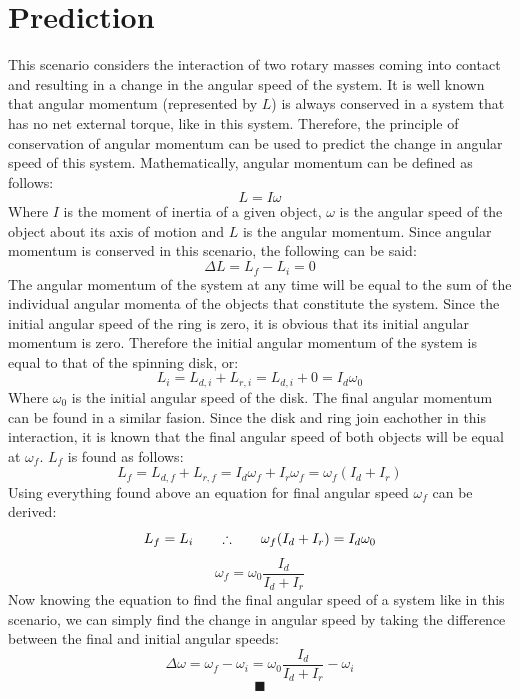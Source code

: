 \documentclass[12pt,letterpaper]{article}
\begin{document}
\section{Prediction}
This scenario considers the interaction of two rotary masses coming into contact and resulting in a change in the angular speed of the system. It is well known that angular momentum (represented by \(L\)) is always conserved in a system that has no net external torque, like in this system. Therefore, the principle of conservation of angular momentum can be used to predict the change in angular speed of this system. Mathematically, angular momentum can be defined as follows:
\begin{equation}
L = I\omega
\end{equation}
Where \(I\) is the moment of inertia of a given object, \(\omega\) is the angular speed of the object about its axis of motion and \(L\) is the angular momentum. Since angular momentum is conserved in this scenario, the following can be said:
\begin{equation}
\Delta L = L_f - L_i = 0
\end{equation}
The angular momentum of the system at any time will be equal to the sum of the individual angular momenta of the objects that constitute the system. Since the initial angular speed of the ring is zero, it is obvious that its initial angular momentum is zero. Therefore the initial angular momentum of the system is equal to that of the spinning disk, or:
\begin{equation}
L_i = L_{d,i} + L_{r,i} = L_{d,i} + 0 = I_d\omega_0
\end{equation}
Where \(\omega_0\) is the initial angular speed of the disk. The final angular momentum can be found in a similar fasion. Since the disk and ring join eachother in this interaction, it is known that the final angular speed of both objects will be equal at \(\omega_f\). \(L_f\) is found as follows:
\begin{equation}
L_f = L_{d,f} + L_{r,f} = I_d\omega_f + I_r\omega_f = \omega_f (I_d + I_r)
\end{equation}
Using everything found above an equation for final angular speed \(\omega_f\) can be derived:
\begin{equation}
L_f = L_i \hspace{0.25in}\therefore \hspace{0.25in} \omega_f (I_d + I_r) = I_d\omega_0
\end{equation}
\begin{equation}
\omega_f = \omega_0 \frac{I_d}{I_d + I_r}
\end{equation}
Now knowing the equation to find the final angular speed of a system like in this scenario, we can simply find the change in angular speed by taking the difference between the final and initial angular speeds:
\begin{equation}
\Delta\omega = \omega_f -\omega_i = \omega_0 \frac{I_d}{I_d + I_r} - \omega_i
\end{equation}
\begin{equation}
\blacksquare \nonumber
\end{equation}
\pagebreak  
\end{document}
